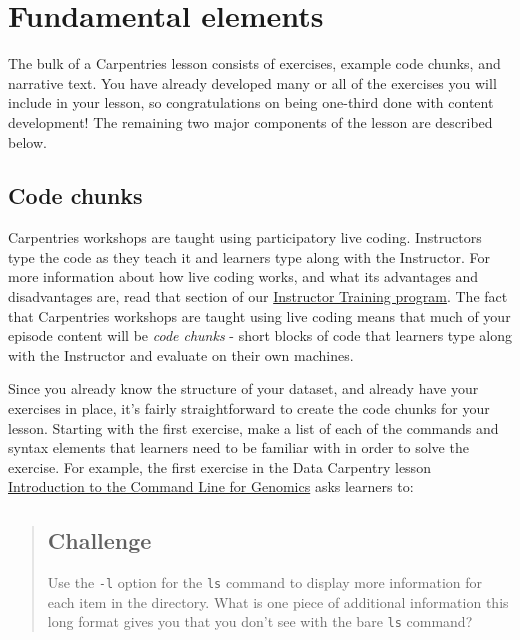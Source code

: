 \documentclass[
]{book}
\begin{document}
\hypertarget{fundamental-elements}{%
\section{Fundamental elements}\label{fundamental-elements}}

The bulk of a Carpentries lesson consists of exercises, example code chunks, and
narrative text. You have already developed many or all of the exercises you will
include in your lesson, so congratulations on being one-third done with content
development! The remaining two major components of the lesson are described
below.

\hypertarget{code-chunks}{%
\subsection{Code chunks}\label{code-chunks}}

Carpentries workshops are taught using participatory live coding. Instructors
type the code as they teach it and learners type along with the Instructor. For
more information about how live coding works, and what its advantages and
disadvantages are, read that section of our \href{https://carpentries.github.io/instructor-training/14-live/index.html}{Instructor Training
program}.
The fact that Carpentries workshops are taught using live coding means that much
of your episode content will be \emph{code chunks} - short blocks of code that
learners type along with the Instructor and evaluate on their own machines.

Since you already know the structure of your dataset, and already have your
exercises in place, it's fairly straightforward to create the code chunks for
your lesson. Starting with the first exercise, make a list of each of the
commands and syntax elements that learners need to be familiar with in order to
solve the exercise. For example, the first exercise in the Data Carpentry lesson
\href{https://datacarpentry.org/shell-genomics/}{Introduction to the Command Line for
Genomics} asks learners to:

\begin{quote}
\hypertarget{challenge}{%
\subsection*{Challenge}\label{challenge}}

Use the \texttt{-l} option for the \texttt{ls} command to display more information for each
item in the directory. What is one piece of additional information this long
format gives you that you don't see with the bare \texttt{ls} command?
\end{quote}
\end{document}
